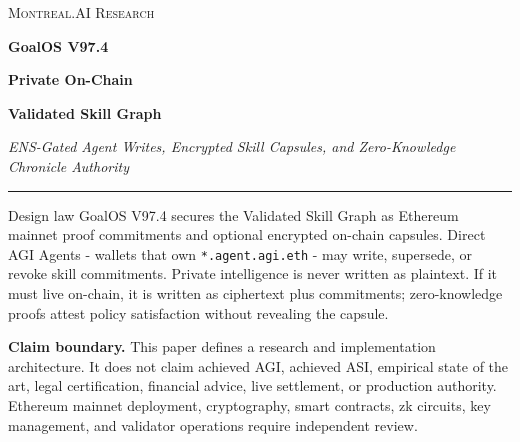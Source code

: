 \documentclass[11pt]{article}
\newcommand{\code}[1]{\texttt{#1}}
\begin{document}
\begin{titlepage}
\thispagestyle{empty}
\vspace*{1.0cm}
\begin{center}
  {\Large\scshape Montreal.AI Research}\par
  \vspace{1.15cm}
  {\fontsize{34}{38}\selectfont\bfseries\color{ink} GoalOS V97.4}\par
  \vspace{0.18cm}
  {\fontsize{24}{30}\selectfont\bfseries\color{royal} Private On-Chain}\par
  {\fontsize{24}{30}\selectfont\bfseries\color{royal} Validated Skill Graph}\par
  \vspace{0.55cm}
  {\Large\itshape\color{ink} ENS-Gated Agent Writes, Encrypted Skill Capsules, and Zero-Knowledge Chronicle Authority}\par
  \vspace{0.8cm}
  \rule{0.42\linewidth}{0.45pt}\par
  \vspace{0.9cm}
\end{center}

\begin{thesisbox}{Design law}
GoalOS V97.4 secures the Validated Skill Graph as Ethereum mainnet proof commitments and optional encrypted on-chain capsules. Direct AGI Agents - wallets that own \code{*.agent.agi.eth} - may write, supersede, or revoke skill commitments. Private intelligence is never written as plaintext. If it must live on-chain, it is written as ciphertext plus commitments; zero-knowledge proofs attest policy satisfaction without revealing the capsule.
\end{thesisbox}

\vfill
\begin{center}
\begin{minipage}{0.86\linewidth}
\small\color{ink}
\textbf{Claim boundary.} This paper defines a research and implementation architecture. It does not claim achieved AGI, achieved ASI, empirical state of the art, legal certification, financial advice, live settlement, or production authority. Ethereum mainnet deployment, cryptography, smart contracts, zk circuits, key management, and validator operations require independent review.
\end{minipage}
\end{center}
\end{titlepage}
\end{document}
